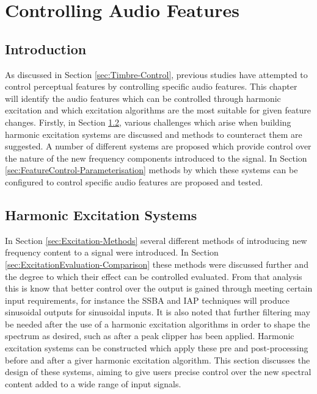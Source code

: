
\chapter{Controlling Audio Features} %
\label{chap:FeatureControl}

\section{Introduction}
\label{sec:FeatureControl-Introduction}
	As discussed in Section \ref{sec:Timbre-Control}, previous studies have attempted to control perceptual features by
	controlling specific audio features. This chapter will identify the audio features which can be controlled through
	harmonic excitation and which excitation algorithms are the most suitable for given feature changes. Firstly, in
	Section \ref{sec:FeatureControl-Systems}, various challenges which arise when building harmonic excitation systems
	are discussed and methods to counteract them are suggested. A number of different systems are proposed which
	provide control over the nature of the new frequency components introduced to the signal. In Section
	\ref{sec:FeatureControl-Parameterisation} methods by which these systems can be configured to control specific
	audio features are proposed and tested.

\section{Harmonic Excitation Systems}
\label{sec:FeatureControl-Systems}
	In Section \ref{sec:Excitation-Methods} several different methods of introducing new frequency content to a signal
	were introduced. In Section \ref{sec:ExcitationEvaluation-Comparison} these methods were discussed further and the
	degree to which their effect can be controlled evaluated. From that analysis this is know that better control over
	the output is gained through meeting certain input requirements, for instance the SSBA and IAP techniques will
	produce sinusoidal outputs for sinusoidal inputs. It is also noted that further filtering may be needed after the
	use of a harmonic excitation algorithms in order to shape the spectrum as desired, such as after a peak clipper has
	been applied. Harmonic excitation systems can be constructed which apply these pre and post-processing before and
	after a giver harmonic excitation algorithm. This section discusses the design of these systems, aiming to give
	users precise control over the new spectral content added to a wide range of input signals.

